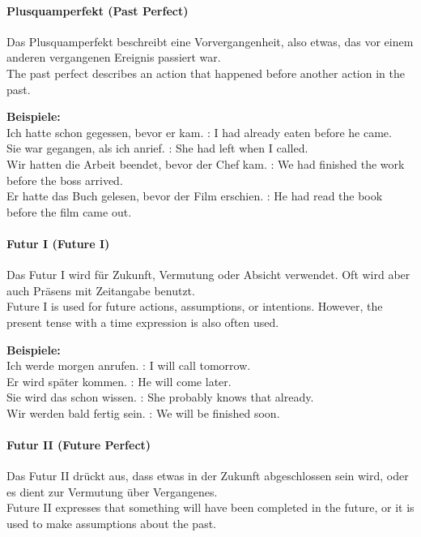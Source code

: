 \documentclass[a4paper]{article}
\begin{document}
        \paragraph{Plusquamperfekt {\small (Past Perfect)}}
            Das Plusquamperfekt beschreibt eine Vorvergangenheit, also etwas, das vor einem anderen vergangenen Ereignis passiert war.\\
            The past perfect describes an action that happened before another action in the past.
            
            \textbf{Beispiele:}\\
            Ich hatte schon gegessen, bevor er kam. : I had already eaten before he came.\\
            Sie war gegangen, als ich anrief. : She had left when I called.\\
            Wir hatten die Arbeit beendet, bevor der Chef kam. : We had finished the work before the boss arrived.\\
            Er hatte das Buch gelesen, bevor der Film erschien. : He had read the book before the film came out.
        
        \paragraph{Futur I {\small (Future I)}}
            Das Futur I wird für Zukunft, Vermutung oder Absicht verwendet. Oft wird aber auch Präsens mit Zeitangabe benutzt.\\
            Future I is used for future actions, assumptions, or intentions. However, the present tense with a time expression is also often used.
            
            \textbf{Beispiele:}\\
            Ich werde morgen anrufen. : I will call tomorrow.\\
            Er wird später kommen. : He will come later.\\
            Sie wird das schon wissen. : She probably knows that already.\\
            Wir werden bald fertig sein. : We will be finished soon.
        
        \paragraph{Futur II {\small (Future Perfect)}}
            Das Futur II drückt aus, dass etwas in der Zukunft abgeschlossen sein wird, oder es dient zur Vermutung über Vergangenes.\\
            Future II expresses that something will have been completed in the future, or it is used to make assumptions about the past.
            
\end{document}
